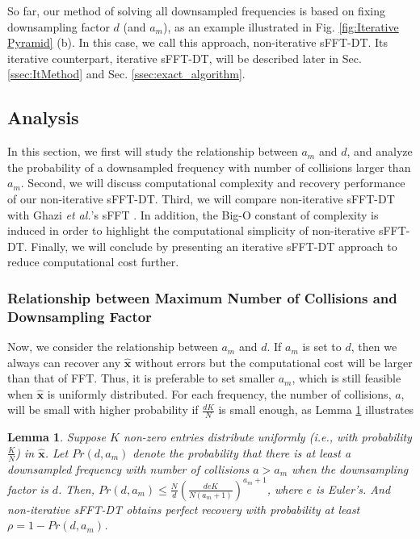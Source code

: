 \documentclass[journal,onecolumn,11pt]{IEEEtran}
\newtheorem{lemma}{Lemma}
\begin{document}
So far, our method of solving all downsampled frequencies is based on fixing downsampling factor $d$ (and $a_{m}$), as an example illustrated in Fig. \ref{fig:Iterative Pyramid} (b).
In this case, we call this approach, non-iterative sFFT-DT.
Its iterative counterpart, iterative sFFT-DT,
will be described later in Sec. \ref{ssec:ItMethod} and Sec. \ref{ssec:exact_algorithm}.



\subsection{Analysis}\label{ssec:howtochoose_a_and_d}

In this section, we first will study the relationship between $a_{m}$ and $d$, and analyze the probability of a downsampled frequency with number of collisions larger than $a_m$.
Second, we will discuss computational complexity and recovery performance of our non-iterative sFFT-DT.
Third, we will compare non-iterative sFFT-DT with Ghazi {\em et al.}'s sFFT \cite{Ghazi2013}.
In addition, the Big-O constant of complexity is induced in order to highlight the computational simplicity of non-iterative sFFT-DT.
Finally, we will conclude by presenting an iterative sFFT-DT approach to reduce computational cost further.

\subsubsection{Relationship between Maximum Number of Collisions and Downsampling Factor}
Now, we consider the relationship between $a_m$ and $d$.
If $a_{m}$ is set to $d$, then we always can recover any $\bm{\hat{x}}$ without errors but the computational cost
will be larger than that of FFT.
Thus, it is preferable to set smaller $a_{m}$, which is still feasible when $\bm{\hat{x}}$ is uniformly distributed.
For each frequency, the number of collisions, $a$, will be small with higher probability if $\frac{dK}{N}$ is small enough, as Lemma \ref{lemma:probability of bin} illustrates
\begin{lemma}
\label{lemma:probability of bin}
Suppose $K$ non-zero entries distribute uniformly ({\em i.e.}, with probability $\frac{K}{N}$) in $\bm{\hat{x}}$.
Let $Pr(d,a_{m})$ denote the probability that there is at least a downsampled frequency with number of collisions $a > a_{m}$ when the downsampling factor is $d$.
Then, $Pr(d,a_{m})\leq \frac{N}{d} (\frac{deK}{N(a_{m}+1)})^{a_{m}+1}$, where $e$ is Euler's.
And non-iterative sFFT-DT obtains perfect recovery with probability at least $\rho=1-Pr(d,a_{m})$.
\end{lemma}
\end{document}
